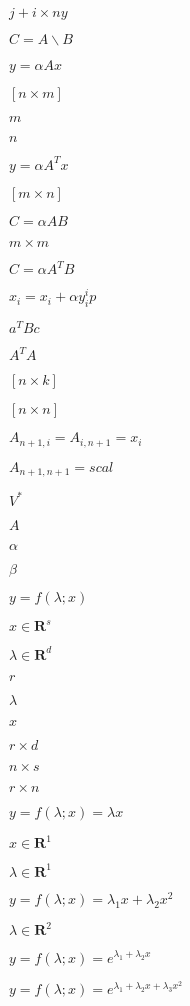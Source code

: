 \documentclass{article}
\begin{document}
$j+i\times ny$
\pagebreak

$ C=A\backslash B$
\pagebreak

$y=\alpha Ax$
\pagebreak

$\left[n\times m\right]$
\pagebreak

$m$
\pagebreak

$n$
\pagebreak

$y=\alpha A^Tx$
\pagebreak

$\left[m\times n\right]$
\pagebreak

$C=\alpha AB$
\pagebreak

$m\times m$
\pagebreak

$C=\alpha A^TB$
\pagebreak

$x_i=x_i+\alpha y_i^ip$
\pagebreak

$a^T B c$
\pagebreak

$A^T A$
\pagebreak

$\left[n\times k\right]$
\pagebreak

$\left[n\times n\right]$
\pagebreak

$A_{n+1,i}=A_{i,n+1}=x_i$
\pagebreak

$A_{n+1,n+1}=scal$
\pagebreak

$V^*$
\pagebreak

$A$
\pagebreak

$\alpha$
\pagebreak

$\beta$
\pagebreak

$y=f(\lambda;x)$
\pagebreak

$x\in\mathbf{R}^s$
\pagebreak

$\lambda\in\mathbf{R}^d$
\pagebreak

$r$
\pagebreak

$\lambda$
\pagebreak

$x$
\pagebreak

$r\times d$
\pagebreak

$n\times s$
\pagebreak

$r\times n$
\pagebreak

$y=f(\lambda;x)=\lambda x$
\pagebreak

$x\in\mathbf{R}^1$
\pagebreak

$\lambda\in\mathbf{R}^1$
\pagebreak

$y=f(\lambda;x)=\lambda_1 x+\lambda_2x^2$
\pagebreak

$\lambda\in\mathbf{R}^2$
\pagebreak

$y=f(\lambda;x)=e^{\lambda_1 +\lambda_2x}$
\pagebreak

$y=f(\lambda;x)=e^{\lambda_1 +\lambda_2x+\lambda_3x^2}$
\pagebreak
\end{document}
